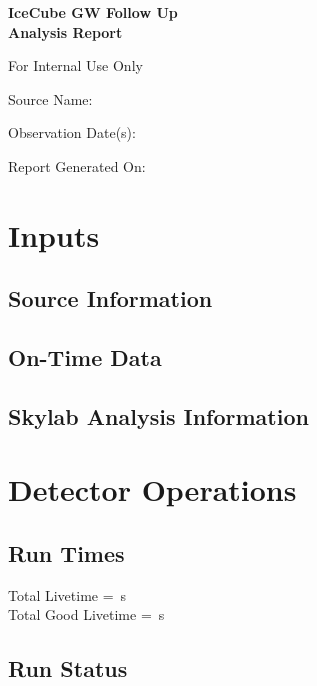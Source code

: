 \documentclass[titlepage]{article}
\begin{document}
\begin{titlepage}
  \centering
  \vspace{4cm}
  {\huge\bfseries IceCube GW Follow Up \\ Analysis Report\par}
  \vspace{1cm}
  {\LARGE For Internal Use Only\par}
  \vfill
  {\Large Source Name: \\ \itshape\sourcename\par}
  \vspace{0.5cm}
  {\Large Observation Date(s):\\ \obsdate \par}
  \vfill
  \vspace{1cm}
  {\Large Report Generated On:\\ \reportdate \par}
\end{titlepage}

\centering
\section{Inputs}
\subsection{Source Information}
\sourcetable
\subsection{On-Time Data}
\ontimetable
\subsection{Skylab Analysis Information}
\skylabtable 

\pagebreak
\centering
\section{Detector Operations}

\subsection{Run Times}
\runtimetable

Total Livetime = \livetime\,s \\
Total Good Livetime = \goodLivetime\,s

\centering
\subsection{Run Status}
\runstatustable
\end{document}
